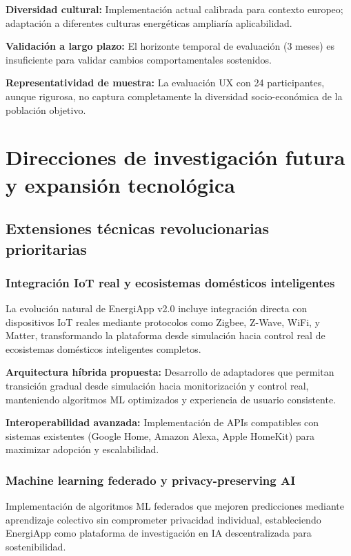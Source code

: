 \textbf{Diversidad cultural:} Implementación actual calibrada para contexto europeo; adaptación a diferentes culturas energéticas ampliaría aplicabilidad.

\textbf{Validación a largo plazo:} El horizonte temporal de evaluación (3 meses) es insuficiente para validar cambios comportamentales sostenidos.

\textbf{Representatividad de muestra:} La evaluación UX con 24 participantes, aunque rigurosa, no captura completamente la diversidad socio-económica de la población objetivo.

\section{Direcciones de investigación futura y expansión tecnológica}

\subsection{Extensiones técnicas revolucionarias prioritarias}

\subsubsection{Integración IoT real y ecosistemas domésticos inteligentes}

La evolución natural de EnergiApp v2.0 incluye integración directa con dispositivos IoT reales mediante protocolos como Zigbee, Z-Wave, WiFi, y Matter, transformando la plataforma desde simulación hacia control real de ecosistemas domésticos inteligentes completos.

\textbf{Arquitectura híbrida propuesta:} Desarrollo de adaptadores que permitan transición gradual desde simulación hacia monitorización y control real, manteniendo algoritmos ML optimizados y experiencia de usuario consistente.

\textbf{Interoperabilidad avanzada:} Implementación de APIs compatibles con sistemas existentes (Google Home, Amazon Alexa, Apple HomeKit) para maximizar adopción y escalabilidad.

\subsubsection{Machine learning federado y privacy-preserving AI}

Implementación de algoritmos ML federados que mejoren predicciones mediante aprendizaje colectivo sin comprometer privacidad individual, estableciendo EnergiApp como plataforma de investigación en IA descentralizada para sostenibilidad.

